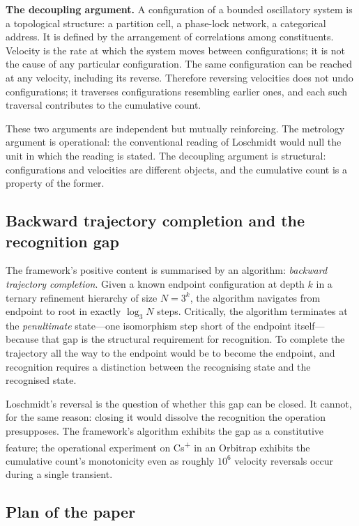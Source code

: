 \documentclass[twocolumn,10pt,a4paper]{article}
\theoremstyle{thmstyle}
\theoremstyle{definition}
\theoremstyle{remark}
\begin{document}
\textbf{The decoupling argument.} A configuration of a bounded
oscillatory system is a topological structure: a partition cell, a
phase-lock network, a categorical address. It is defined by the
arrangement of correlations among constituents. Velocity is the rate
at which the system moves between configurations; it is not the cause
of any particular configuration. The same configuration can be reached
at any velocity, including its reverse. Therefore reversing velocities
does not undo configurations; it traverses configurations resembling
earlier ones, and each such traversal contributes to the cumulative
count.

These two arguments are independent but mutually reinforcing. The
metrology argument is operational: the conventional reading of
Loschmidt would null the unit in which the reading is stated. The
decoupling argument is structural: configurations and velocities are
different objects, and the cumulative count is a property of the
former.

\subsection{Backward trajectory completion and the recognition gap}

The framework's positive content is summarised by an algorithm:
\emph{backward trajectory completion}. Given a known endpoint
configuration at depth $k$ in a ternary refinement hierarchy of size
$N=3^{k}$, the algorithm navigates from endpoint to root in exactly
$\log_{3}N$ steps. Critically, the algorithm terminates at the
\emph{penultimate} state---one isomorphism step short of the endpoint
itself---because that gap is the structural requirement for
recognition. To complete the trajectory all the way to the endpoint
would be to become the endpoint, and recognition requires a
distinction between the recognising state and the recognised state.

Loschmidt's reversal is the question of whether this gap can be
closed. It cannot, for the same reason: closing it would dissolve
the recognition the operation presupposes. The framework's algorithm
exhibits the gap as a constitutive feature; the operational experiment
on Cs\textsuperscript{+} in an Orbitrap exhibits the cumulative
count's monotonicity even as roughly $10^{6}$ velocity reversals
occur during a single transient.

\subsection{Plan of the paper}
\end{document}
